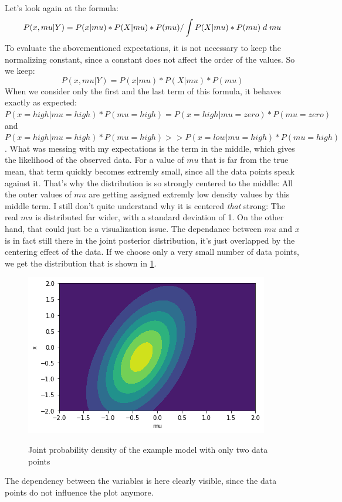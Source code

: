 \documentclass{article}
\begin{document}
Let's look again at the formula:
\begin{equation}
P(x,mu|Y) = P(x|mu) * P(X|mu) * P(mu) / \int P(X|mu) * P(mu) \hspace{1mm} d \hspace{1mm} mu
\end{equation}
To evaluate the abovementioned expectations, it is not necessary to keep the normalizing constant, since a constant does not affect the order of the values. So we keep:
\begin{equation}
P(x,mu|Y) = P(x|mu) * P(X|mu) * P(mu)
\end{equation}
When we consider only the first and the last term of this formula, it behaves exactly as expected: $P(x=high|mu=high)*P(mu=high) = P(x=high|mu=zero)*P(mu=zero)$
and $P(x=high|mu=high)*P(mu=high) >> P(x=low|mu=high)*P(mu=high)$. What was messing with my expectations is the term in the middle, which gives the likelihood of the observed data. For a value of $mu$ that is far from the true mean, that term quickly becomes extremly small, since all the data points speak against it. That's why the distribution is so strongly centered to the middle: All the outer values of $mu$ are getting assigned extremly low density values by this middle term. I still don't quite understand why it is centered \textit{that} strong: The real $mu$ is distributed far wider, with a standard deviation of 1. On the other hand, that could just be a visualization issue.
The dependance between $mu$ and $x$ is in fact still there in the joint posterior distribution, it's just overlapped by the centering effect of the data. If we choose only a very small number of data points, we get the distribution that is shown in \ref{fig:ground_truth_joint_posterior_2}.
\begin{figure}
	\includegraphics[width=\textwidth]{images/ground_truth_joint_posterior_2.png}
	\label{fig:ground_truth_joint_posterior_2}
	\caption[Joint probability density of the example model with only two data points]{Joint probability density of the example model with only two data points}
\end{figure}
The dependency between the variables is here clearly visible, since the data points do not influence the plot anymore.
\end{document}
